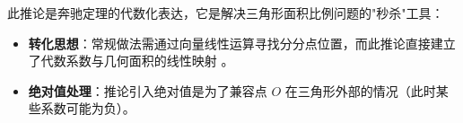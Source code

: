 \begin{explanationbox}
此推论是奔驰定理的代数化表达，它是解决三角形面积比例问题的"秒杀"工具：
\begin{itemize}
    \item \textbf{转化思想}：常规做法需通过向量线性运算寻找分分点位置，而此推论直接建立了代数系数与几何面积的线性映射 。
    \item \textbf{绝对值处理}：推论引入绝对值是为了兼容点 $O$ 在三角形外部的情况（此时某些系数可能为负）。
\end{itemize}
\end{explanationbox}